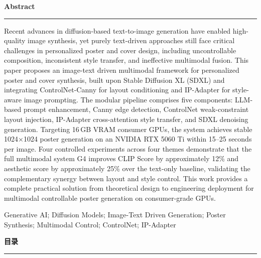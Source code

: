 \documentclass[12pt,a4paper]{ctexart}
\begin{document}
\newpage
\thispagestyle{empty}
\vspace*{4cm}
\begin{center}
{\color{primary}\LARGE\bfseries Abstract}\\[14pt]
\color{secondary}\rule{0.35\textwidth}{0.6pt}
\end{center}
\vspace{1.2cm}
\begin{minipage}{0.88\textwidth}
\normalsize
Recent advances in diffusion-based text-to-image generation have enabled high-quality image synthesis, yet purely text-driven approaches still face critical challenges in personalized poster and cover design, including uncontrollable composition, inconsistent style transfer, and ineffective multimodal fusion. This paper proposes an image-text driven multimodal framework for personalized poster and cover synthesis, built upon Stable Diffusion XL (SDXL) and integrating ControlNet-Canny for layout conditioning and IP-Adapter for style-aware image prompting. The modular pipeline comprises five components: LLM-based prompt enhancement, Canny edge detection, ControlNet weak-constraint layout injection, IP-Adapter cross-attention style transfer, and SDXL denoising generation. Targeting 16\,GB VRAM consumer GPUs, the system achieves stable 1024$\times$1024 poster generation on an NVIDIA RTX 5060 Ti within 15--25 seconds per image. Four controlled experiments across four themes demonstrate that the full multimodal system G4 improves CLIP Score by approximately 12\% and aesthetic score by approximately 25\% over the text-only baseline, validating the complementary synergy between layout and style control. This work provides a complete practical solution from theoretical design to engineering deployment for multimodal controllable poster generation on consumer-grade GPUs.

\vspace{16pt}
 Generative AI; Diffusion Models; Image-Text Driven Generation; Poster Synthesis; Multimodal Control; ControlNet; IP-Adapter
\end{minipage}
\vfill\vspace*{0pt}

\newpage
\thispagestyle{empty}
\vspace*{2cm}
\begin{center}
{\color{primary}\LARGE\bfseries 目\quad 录}\\[14pt]
\color{secondary}\rule{0.35\textwidth}{0.6pt}
\end{center}
\vspace{1.2cm}
{\small\tableofcontents}
\vfill\vspace*{0pt}
\newpage
\end{document}
